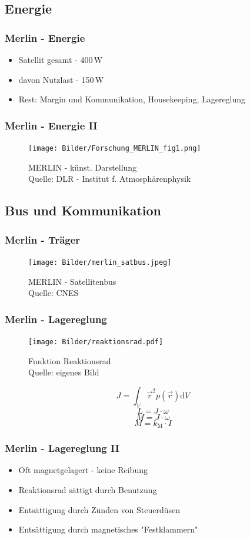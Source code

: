 \documentclass{beamer}
\begin{document}
\subsection{Energie}
\begin{frame}
  \frametitle{Merlin - Energie}
  \begin{itemize}
    \item Satellit gesamt - 400\,W
    \item davon Nutzlast - 150\,W
    \item Rest: Margin und Kommunikation, Housekeeping, Lagereglung
  \end{itemize}
\end{frame}

\begin{frame}
  \frametitle{Merlin - Energie II} 
  \begin{figure}[t]
    \centering
    \texttt{[image: Bilder/Forschung\_MERLIN\_fig1.png]}
    \caption{MERLIN - künst. Darstellung\\ 
    Quelle: DLR - Institut f. Atmosphärenphysik}
  \end{figure}
\end{frame}

\subsection{Bus und Kommunikation}
\begin{frame}
  \frametitle{Merlin - Träger} 
  \begin{figure}[t]
    \centering
    \texttt{[image: Bilder/merlin\_satbus.jpeg]}
    \caption{MERLIN - Satellitenbus\\ 
    Quelle: CNES}
  \end{figure}
\end{frame}

\begin{frame}
  \frametitle{Merlin - Lagereglung} 
  \begin{figure}[t]
    \centering
    \texttt{[image: Bilder/reaktionsrad.pdf]}
    \caption{Funktion Reaktionsrad\\ 
    Quelle: eigenes Bild}
  \end{figure}
  \[J = \int_V \vec{r}^2 p(\vec{r})\mathrm{d}V\]
  \[L = J \cdot \omega\]
  \[M = J \cdot \dot{\omega}\]
  \[M = k_{\mathrm{M}}\cdot I\]
\end{frame}

\begin{frame}
  \frametitle{Merlin - Lagereglung II }
  \begin{itemize}
    \item Oft magnetgelagert - keine Reibung
    \item Reaktionsrad sättigt durch Benutzung
    \item Entsättigung durch Zünden von Steuerdüsen
    \item Entsättigung durch magnetisches "Festklammern" 
  \end{itemize}
\end{frame}
\end{document}
